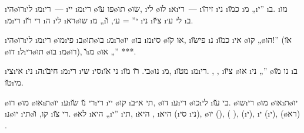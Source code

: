  \i{הי}\o{רו}\i{לי} \i{מ}\i{רי}~— \i{יי} \i{מ}\i{רי}  \o{פּו} \u{עו}\o{תו}  \o{שׂו}, \i{לי} \o{לו}  \i{א}\i{רי}~— \i{זי}\u{הו} \i{ני} \i{כ}\u{מו}  \i{מ} „\i{י}” \i{ב}. \i{מו} \i{מ}\i{רי} \i{רי}  \u{רו} \i{ה}  \i{לי} \i{רא}\o{שו}  \i{מ} „\i{י}” = ע׳, \u{ו} \i{ני}  \i{צ}\u{יו}  \i{לי} ע׳ \i{ב}.

 \i{הי}\o{רו}\i{לי} \i{מ}\i{רי} \o{מו}\i{פי} \i{ב}\o{תו}\o{בו} \i{מ}\i{ר}\o{יו} \o{בּו} \i{מ}\i{סי} \o{או} \u{קו},  \i{פי}\u{שו} \i{נ} \i{כ}\u{מו}  \i{אי} \o{קו} „\o{הו}!” (\u{או} \o{דו} \i{ל}\i{רי}\o{תו}   \o{בו} \i{מ}\o{רו}), \u{ו}\i{מ}   \o{או} „” ***.

\i{צי}\i{אי} \i{ני}  \i{ה}\i{חי}\u{בו}  \i{מ}\i{רי}  \i{שי}   \i{סי}\i{ני} \u{או} \i{בי}.  \u{רו} \u{מו}\o{נו} \i{מ},   \i{מ}\u{טו}  \i{מ}\i{רי}. , , \i{צ}\u{יו} \o{או} \i{ני} „” \o{נו} \u{מו} \i{ב} \u{טו}\i{מי}.

\o{רו} \o{מו} \o{או}\i{ת}\o{יו} \i{ע}\i{רי}  \u{נו} \u{שו}\i{רי} \i{יי} \o{קו} \i{תי}  א״ב, \o{דו} \i{ע}\i{רי} \o{כו}\i{לי} \i{בי}  \u{עו}.  \o{שו}\i{רי}  \o{מו} \o{או}\i{ת}\o{יו} \i{נ}\o{יו} \i{תי}\o{קו}, \u{ו} \i{רי}  \u{צו}.  \o{לא} \i{היא} „\i{י}” \i{תי},   \i{היא} ,  \i{היא}  (\i{סי}  \i{ני}),   \o{יו} (),  ( ),  (\i{י}), \i{י} (\i{י}),  (\o{רא})  .

